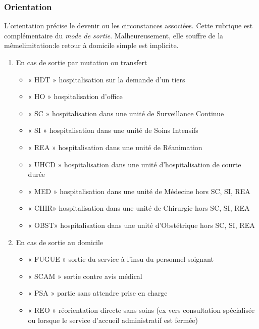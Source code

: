 \documentclass[12pt,english,french,twoside]{report}\usepackage[]{graphicx}\usepackage[]{color}
\begin{document}
\subsubsection{Orientation}

L'orientation précise le devenir ou les circonstances associées. Cette rubrique est complémentaire du \emph{mode de sortie}. Malheureusement, elle souffre de la mêmelimitation:le retour à domicile simple est implicite.

\begin{enumerate}
  \item En cas de sortie par mutation ou transfert
    \begin{itemize}
      \item « HDT » hospitalisation sur la demande d’un tiers
      \item « HO » hospitalisation d’office
      \item « SC » hospitalisation dans une unité de Surveillance Continue
      \item « SI » hospitalisation dans une unité de Soins Intensifs
      \item « REA » hospitalisation dans une unité de Réanimation
      \item « UHCD » hospitalisation dans une unité d’hospitalisation de courte durée
      \item « MED » hospitalisation dans une unité de Médecine hors SC, SI, REA
      \item « CHIR» hospitalisation dans une unité de Chirurgie hors SC, SI, REA
      \item « OBST» hospitalisation dans une unité d’Obstétrique hors SC, SI, REA
    \end{itemize}

  \item En cas de sortie au domicile
    \begin{itemize}
      \item « FUGUE » sortie du service à l’insu du personnel soignant
      \item « SCAM » sortie contre avis médical
      \item « PSA » partie sans attendre prise en charge
      \item « REO » réorientation directe sans soins (ex vers consultation spécialisée ou   lorsque le service d’accueil administratif est fermée)
    \end{itemize}

\end{enumerate}
\end{document}
